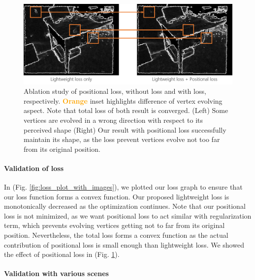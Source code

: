 \begin{figure}
    \includegraphics[width=\columnwidth]{figures/4_result_ablation_study_positional_loss.png}
    \caption{Ablation study of positional loss, without loss and with loss, respectively. \textcolor{Orange}{\textbf{Orange}} inset highlights difference of vertex evolving aspect. Note that total loss of both result is converged. (Left) Some vertices are evolved in a wrong direction with respect to its perceived shape (Right) Our result with positional loss successfully maintain its shape, as the loss prevent vertices evolve not too far from its original position.}
    \label{fig:ablation_study_positional_loss}
\end{figure}

\paragraph{Validation of loss}
In (Fig. \ref{fig:loss_plot_with_images}), we plotted our loss graph to ensure that our loss function forms a convex function. 
Our proposed lightweight loss is monotonically decreased as the optimization continues. 
Note that our positional loss is not minimized, as we want positional loss to act similar with regularization term, which prevents evolving vertices getting not to far from its original position. 
Nevertheless, the total loss forms a convex function as the actual contribution of positional loss is small enough than lightweight loss. 
We showed the effect of positional loss in (Fig. \ref{fig:ablation_study_positional_loss}).

\paragraph{Validation with various scenes}


